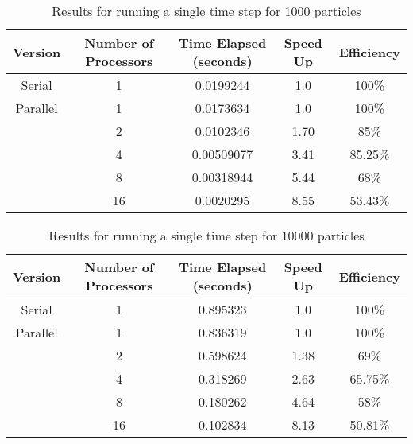 \documentclass[11pt]{article}
\begin{document}
    \begin{table}[H]
        \centering
    \begin{tabular}{|c|c|c|c|c|}
        \hline
        Version & Number of Processors & Time Elapsed (seconds) & Speed Up & Efficiency \\
        \hline
        Serial & 1 & 0.0199244 & 1.0 & 100\% \\
        \hline
        Parallel & 1 & 0.0173634 & 1.0 & 100\% \\
                 & 2 & 0.0102346 & 1.70 & 85\% \\
                 & 4 & 0.00509077 & 3.41 & 85.25\% \\
                 & 8 & 0.00318944 & 5.44 & 68\% \\
                 & 16 & 0.0020295 & 8.55 & 53.43\% \\
        \hline
    \end{tabular}
    \caption{Results for running a single time step for 1000 particles}
    \label{n1000}
    \end{table}

    \begin{table}[H]
        \centering
        \begin{tabular}{|c|c|c|c|c|}
        \hline
        Version & Number of Processors & Time Elapsed (seconds) & Speed Up & Efficiency \\
        \hline
        Serial & 1 & 0.895323 & 1.0 & 100\% \\
        \hline
        Parallel & 1 & 0.836319 & 1.0 & 100\% \\
                 & 2 & 0.598624 & 1.38 & 69\% \\
                 & 4 & 0.318269 & 2.63 & 65.75\% \\
                 & 8 & 0.180262 & 4.64 & 58\% \\
                 & 16 & 0.102834 & 8.13 & 50.81\% \\
        \hline
        \end{tabular}
        \caption{Results for running a single time step for 10000 particles}
    \label{n10000}
    \end{table}
\end{document}

